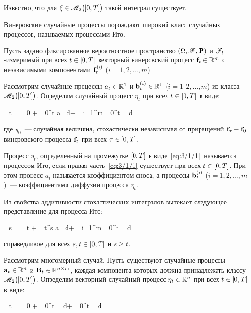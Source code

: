 Известно, что для $\xi \in \mathscr{M}_2\bigl( [0, T] \bigr)$ такой интеграл существует\cite{KLOEDEN}.

\br

Винеровские случайные процессы порождают широкий класс случайных процессов, называемых процессами Ито.

Пусть задано фиксированное вероятностное пространство $(\Omega, \mathscr{F}, \mathbf{P})$ и $\mathscr{F}_t$-измеримый при всех $t \in [0, T]$ векторный винеровский процесс $\mathbf{f}_t \in \mathbb{R}^{m}$ с независимыми компонентами $\mathbf{f}_t^{(i)}$ ($i = 1, 2, \ldots, m$).

Рассмотрим случайные процессы $a_t \in \mathbb{R}^{1}$ и $\mathbf{b}_t^{(i)} \in \mathbb{R}^{1}$ ($i = 1, 2, \ldots, m$) из класса $\mathscr{M}_2\bigl( [0, T] \bigr)$. Определим случайный процесс $\eta_t$ при всех $t \in [0, T]$ в виде:

    \eta_t = \eta_0 + \int\limits_0^t a_\tau\,d\tau + \sum\limits_{i=1}^m \int\limits_0^t _\tau{}\,d_\tau{} \text{,}
\eeq

где $\eta_0$~--- случайная величина, стохастически независимая от приращений $\mathbf{f}_\tau-\mathbf{f}_0$ винеровского процесса $\mathbf{f}_t$ при всех $\tau \in [0, T]$.

\begin{df}
    Процесс $\eta_t$, определенный на промежутке $[0, T]$ в виде~\ref{eq:3/1/1}, называется процессом Ито, если правая часть~\ref{eq:3/1/1} существует при всех $t \in [0, T]$. При этом процесс $a_t$ называется коэффициентом сноса, а процессы $\mathbf{b}_t^{(i)}$ ($i = 1, 2, \ldots, m$)~--- коэффициентами диффузии процесса $\eta_t$.
\end{df}

Из свойства аддитивности стохастических интегралов вытекает следующее представление для процесса Ито:

    \eta_s = \eta_t + \int\limits_t^s a_\tau\,d\tau + \sum\limits_{i=1}^m \int\limits_0^t _\tau{}\,d_\tau{} 
\eeq

справедливое для всех $s, t \in [0, T]$ и $s \geqslant t$.

Рассмотрим многомерный случай. Пусть существуют случайные процессы $\mathbf{a}_t \in \mathbb{R}^{n}$ и $\mathbf{B}_t \in \mathbb{R}^{{n} \times {m}}$, каждая компонента которых должна принадлежать классу $\mathscr{M}_2\bigl( [0, T] \bigr)$. Определим векторный случайный процесс $\mathbf{\eta}_t \in \mathbb{R}^{n}$ при всех $t \in [0, T]$ в виде:

    \m{\eta}_t = \m{\eta}_0 + \int\limits_0^t _\tau\,d\tau + \int\limits_0^t _\tau\,d_\tau \text{,}
\eeq

